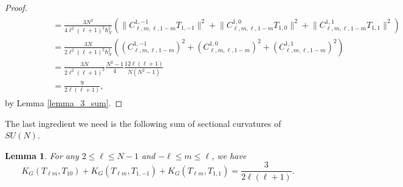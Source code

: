 \documentclass[11pt]{amsart}
\numberwithin{equation}{section}
\newtheorem{lemma}{Lemma}
\theoremstyle{definition}
\begin{document}
\begin{proof}
\begin{gather*}
\begin{split}
&\qquad\qquad=
\frac{3N^2}{4\ell^2(\ell+1)^2\hbar_N^2}\left(
\Big\|C_{\ell,m,\ell,1-m}^{1, -1}T_{1, -1}\Big\|^2 +
\Big\|C_{\ell,m,\ell,1-m}^{1, 0}T_{1, 0}\Big\|^2 +
\Big\|C_{\ell,m,\ell,1-m}^{1, 1}T_{1, 1}\Big\|^2\right) \\
&\qquad\qquad= 
\frac{3N}{2\ell^2(\ell+1)^2\hbar_N^2}\left(
\left(C_{\ell,m,\ell,1-m}^{1, -1}\right)^2 +
\left(C_{\ell,m,\ell,1-m}^{1, 0}\right)^2 +
\left(C_{\ell,m,\ell,1-m}^{1, 1}\right)^2\right) \\
&\qquad\qquad= \frac{3N}{2\ell^2(\ell+1)^2}\frac{N^2-1}{4}\frac{12\ell(\ell+1)}{N(N^2-1)} \\
&\qquad\qquad= \frac{9}{2\ell(\ell+1)},
\end{split}
\end{gather*}
by Lemma \ref{lemma_3_sum}.
\end{proof}
The last ingredient we need is the following sum of sectional curvatures of $SU(N)$.
\begin{lemma}\label{lemma_kg}
For any $2 \leq \ell \leq N-1$ and $-\ell \leq m \leq \ell$, we have
\begin{equation}
K_G(T_{\ell m},T_{10}) + K_G(T_{\ell m}, T_{1, -1}) + K_G(T_{\ell m}, T_{1, 1}) = \frac{3}{2\ell(\ell+1)}.
\end{equation}
\end{lemma}
\end{document}
